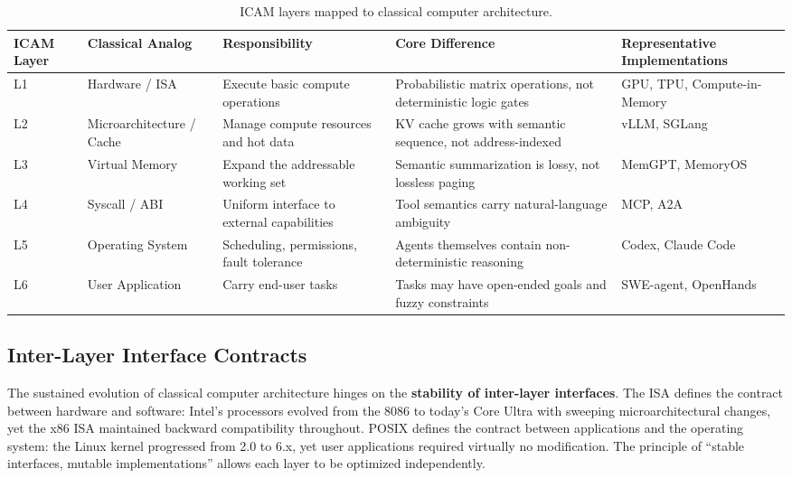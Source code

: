 \documentclass[11pt,a4paper]{article}
\begin{document}
\begin{table}[t]
\centering
\footnotesize
\caption{ICAM layers mapped to classical computer architecture.}
\label{tab:icam}
\begin{tabularx}{\textwidth}{p{}p{}p{}p{}p{}}
\toprule
ICAM Layer & Classical Analog & Responsibility & Core Difference & Representative Implementations \\
\midrule
L1 & Hardware / ISA & Execute basic compute operations & Probabilistic matrix operations, not deterministic logic gates & GPU, TPU, Compute-in-Memory\cite{wolters2024computeinmemory} \\
L2 & Microarchitecture / Cache & Manage compute resources and hot data & KV cache grows with semantic sequence, not address-indexed & vLLM, SGLang\cite{kwon2023pagedattention,sglang2024} \\
L3 & Virtual Memory & Expand the addressable working set & Semantic summarization is lossy, not lossless paging & MemGPT, MemoryOS\cite{memgpt2023,memoryos2025} \\
L4 & Syscall / ABI & Uniform interface to external capabilities & Tool semantics carry natural-language ambiguity & MCP, A2A\cite{mcp_intro_2026,agentprotocols2025} \\
L5 & Operating System & Scheduling, permissions, fault tolerance & Agents themselves contain non-deterministic reasoning & Codex, Claude Code\cite{openai_codex_overview_2026,anthropic_claudecode_overview_2026} \\
L6 & User Application & Carry end-user tasks & Tasks may have open-ended goals and fuzzy constraints & SWE-agent, OpenHands\cite{sweagent2024,openhands_paper_2025} \\
\bottomrule
\end{tabularx}
\end{table}

\subsection{Inter-Layer Interface Contracts}
\label{sec:icam-interfaces}

The sustained evolution of classical computer architecture hinges on the \textbf{stability of inter-layer interfaces}. The ISA defines the contract between hardware and software: Intel's processors evolved from the 8086 to today's Core Ultra with sweeping microarchitectural changes, yet the x86 ISA maintained backward compatibility throughout. POSIX defines the contract between applications and the operating system: the Linux kernel progressed from 2.0 to 6.x, yet user applications required virtually no modification. The principle of ``stable interfaces, mutable implementations'' allows each layer to be optimized independently.
\end{document}
